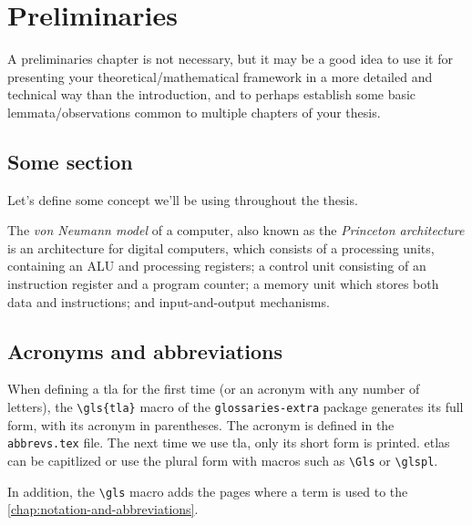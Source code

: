 \chapter{Preliminaries}
\label{chap:prelims}

A preliminaries chapter is not necessary, but it may be a good idea to use it for presenting your theoretical/mathematical framework in a more detailed and technical way than the introduction, and to perhaps establish some basic lemmata/observations common to multiple chapters of your thesis.

\section{Some section}

Let's define some concept we'll be using throughout the thesis.

\begin{definition}
The \emph{von Neumann model} of a computer, also known as the \emph{Princeton architecture} is an architecture for digital computers, which consists of a processing units, containing an ALU and processing registers; a control unit consisting of an instruction register and a program counter; a memory unit which stores both data and instructions; and input-and-output mechanisms.
\end{definition}

\section{Acronyms and abbreviations}

When defining a \gls{tla} for the first time (or an acronym with any number of
letters), the \verb|\gls{tla}| macro of the \texttt{glossaries-extra} package
generates its full form, with its acronym in parentheses. The acronym is defined
in the \texttt{abbrevs.tex} file. The next time we use \gls{tla}, only its
short form is printed. \Glspl{etla} can be capitlized or use the plural form
with macros such as \verb|\Gls| or \verb|\glspl|.

In addition, the \verb|\gls| macro adds the pages where a term is used to the
 \autoref{chap:notation-and-abbreviations}.
